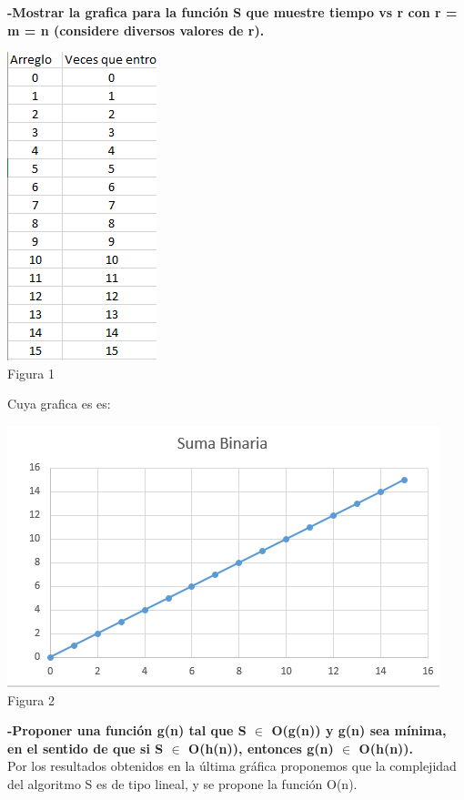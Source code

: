 \documentclass[spanish]{article}
\begin{document}
	{\large{\bf-Mostrar la grafica para la función S que muestre tiempo vs r con r = m = n (considere diversos valores de r).}}\\
	\begin{center}
		\includegraphics{tabla1}
		\\Figura 1\\
	\end{center}
	\newpage
	Cuya grafica es es:\\
	\begin{center}
		\includegraphics{sumaBinaria}\\
		Figura 2\\
	\end{center}
	{\large{\bf -Proponer una función g(n) tal que S $\in$ O(g(n)) y g(n) sea mínima, en el sentido de que si S $\in$  O(h(n)), entonces g(n) $\in$  O(h(n)).}}\\
	Por los resultados obtenidos en la última gráfica proponemos que la complejidad del algoritmo S es de tipo lineal, y se propone la función O(n).
	\bigskip
	
\end{document}
